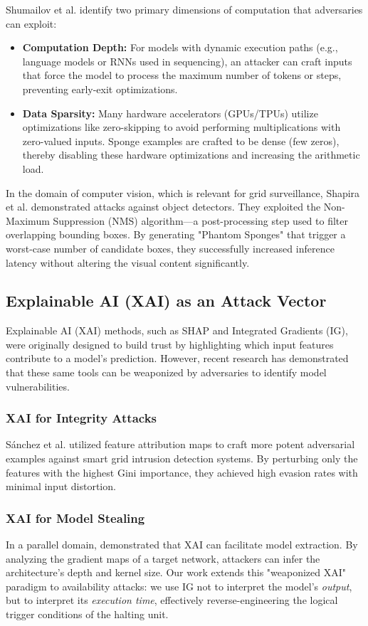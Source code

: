 \documentclass[conference]{IEEEtran}
\begin{document}
Shumailov et al. identify two primary dimensions of computation that adversaries can exploit:
\begin{itemize}
    \item \textbf{Computation Depth:} For models with dynamic execution paths (e.g., language models or RNNs used in sequencing), an attacker can craft inputs that force the model to process the maximum number of tokens or steps, preventing early-exit optimizations.
    \item \textbf{Data Sparsity:} Many hardware accelerators (GPUs/TPUs) utilize optimizations like zero-skipping to avoid performing multiplications with zero-valued inputs. Sponge examples are crafted to be dense (few zeros), thereby disabling these hardware optimizations and increasing the arithmetic load.
\end{itemize}

In the domain of computer vision, which is relevant for grid surveillance, Shapira et al. \cite{shapira2023phantom} demonstrated attacks against object detectors. They exploited the Non-Maximum Suppression (NMS) algorithm—a post-processing step used to filter overlapping bounding boxes. By generating "Phantom Sponges" that trigger a worst-case number of candidate boxes, they successfully increased inference latency without altering the visual content significantly.

\subsection{Explainable AI (XAI) as an Attack Vector}
Explainable AI (XAI) methods, such as SHAP and Integrated Gradients (IG), were originally designed to build trust by highlighting which input features contribute to a model's prediction. However, recent research has demonstrated that these same tools can be weaponized by adversaries to identify model vulnerabilities.

\subsubsection{XAI for Integrity Attacks}
S{\'a}nchez et al. \cite{sanchez2024attacking} utilized feature attribution maps to craft more potent adversarial examples against smart grid intrusion detection systems. By perturbing only the features with the highest Gini importance, they achieved high evasion rates with minimal input distortion.

\subsubsection{XAI for Model Stealing}
In a parallel domain, \cite{steganographic2026} demonstrated that XAI can facilitate model extraction. By analyzing the gradient maps of a target network, attackers can infer the architecture's depth and kernel size. Our work extends this "weaponized XAI" paradigm to availability attacks: we use IG not to interpret the model's \textit{output}, but to interpret its \textit{execution time}, effectively reverse-engineering the logical trigger conditions of the halting unit.
\end{document}
